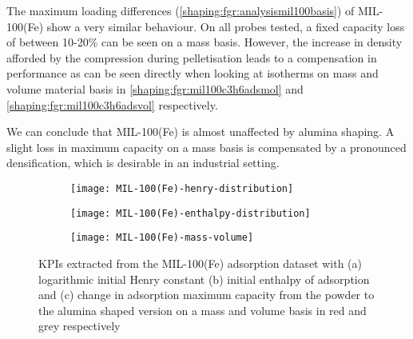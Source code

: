 The maximum loading differences (\autoref{shaping:fgr:analysismil100basis})
of MIL-100(Fe) show a very similar behaviour.
On all probes tested, a fixed capacity
loss of between 10-20\% can be seen on a mass
basis. However, the increase in density afforded by the
compression during pelletisation leads to a compensation in
performance as can be seen directly when looking at isotherms on mass and
volume material basis in \autoref{shaping:fgr:mil100c3h6adsmol} and
\autoref{shaping:fgr:mil100c3h6adsvol} respectively.

We can conclude that MIL-100(Fe) is almost unaffected by alumina shaping.
A slight loss in maximum capacity on a mass basis is compensated by a pronounced densification, which is desirable in an industrial setting.

\begin{figure}
	\centering
	\begin{subfigure}{\linewidth}
		\parbox[c]{0.1\linewidth}{\caption{}%
			\label{shaping:fgr:analysismil100henry}}%
		\parbox[b]{0.8\linewidth}{%
			\texttt{[image: MIL-100(Fe)-henry-distribution]}%
		}%
	\end{subfigure}%

	\begin{subfigure}{\linewidth}
		\parbox[c]{0.1\linewidth}{\caption{}%
			\label{shaping:fgr:analysismil100enth}}%
		\parbox[b]{0.8\linewidth}{%
			\texttt{[image: MIL-100(Fe)-enthalpy-distribution]}%
		}%
	\end{subfigure}%

	\begin{subfigure}{\linewidth}
		\parbox[c]{0.1\linewidth}{\caption{}%
			\label{shaping:fgr:analysismil100basis}}%
		\parbox[b]{0.8\linewidth}{%
			\texttt{[image: MIL-100(Fe)-mass-volume]}%
		}%
	\end{subfigure}%

	\caption{KPIs extracted from the MIL-100(Fe) adsorption dataset with
		(a) logarithmic initial Henry constant (b) initial enthalpy of
		adsorption and (c) change in adsorption maximum capacity from the powder
		to the alumina shaped version on a mass and volume basis in red and grey
		respectively}%
	\label{shaping:fgr:analysismil100}
\end{figure}